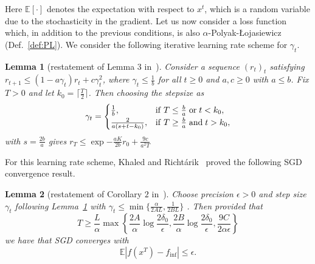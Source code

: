 \documentclass[
    reprint,
    aps,
    prx,
    longbibliography
]{revtex4-2}
\newtheorem{lemma}{Lemma}
\begin{document}
Here $\mathbb{E}[\cdot]$ denotes the expectation with respect to $x^t$, which is a random variable due to the stochasticity in the gradient. Let us now consider a loss function which, in addition to the previous conditions, is also $\alpha$-Polyak-{\L}ojasiewicz (Def.~\ref{def:PL}). We consider the following iterative learning rate scheme for $\gamma_t$. 
\begin{lemma}[restatement of Lemma $3$ in~\cite{Khaled2020}]
\label{lem:lrscheme}
Consider a sequence $(r_t)_t$ satisfying $r_{t+1}\leq (1-a \gamma_t)r_t + c\gamma_t^2$, where $\gamma_t \leq \frac{1}{b}$ for all $t\geq 0$ and $a,c\geq 0$ with $a\leq b$. Fix $T>0$ and let $k_0=\lceil \frac{T}{2}\rceil$. Then choosing the stepsize as 
\begin{equation}
    \gamma_t = \begin{cases}
       \frac{1}{b}, & \mathrm{if} \hspace{1mm} T \leq \frac{b}{a} \hspace{1mm} \mathrm{or} \hspace{1mm} t<k_0,\\
       \frac{2}{a(s+t-k_0)}, & \mathrm{if }\hspace{1mm} T \geq \frac{b}{a} \hspace{1mm} \mathrm{and} \hspace{1mm} t>k_0,\\
    \end{cases}
\end{equation} with $s=\frac{2b}{a}$ gives $r_T \leq \exp{-\frac{aK}{2b}}r_0 + \frac{9c}{a^2T}$
\end{lemma}
For this learning rate scheme, Khaled and Richt{\'a}rik~\cite{Khaled2020} proved the following SGD convergence result.

\begin{lemma}[restatement of Corollary $2$ in~\cite{Khaled2020}]
\label{lem:sgd_conv_2}
Choose precision $\epsilon > 0$ and step size $\gamma_t$ following Lemma~\ref{lem:lrscheme} with $\gamma_t\leq \min \{\frac{\alpha}{2AL}, \frac{1}{2BL}\}$ . Then provided that 
\begin{equation}
\label{eq:condition_1}
T \geq \frac{L}{\alpha} \max \left\{ \frac{2A}{\alpha}\log{\frac{2\delta_0}{\epsilon}}, \frac{2B}{\alpha}\log{\frac{2\delta_0}{\epsilon}}, \frac{9C}{2\alpha \epsilon} \right\}
\end{equation} 
we have that SGD converges with 
\begin{equation}
 \mathbb{E} |f(x^T)-f_{\mathrm{inf}} | \leq \epsilon .
\end{equation}
\end{lemma}
\end{document}
